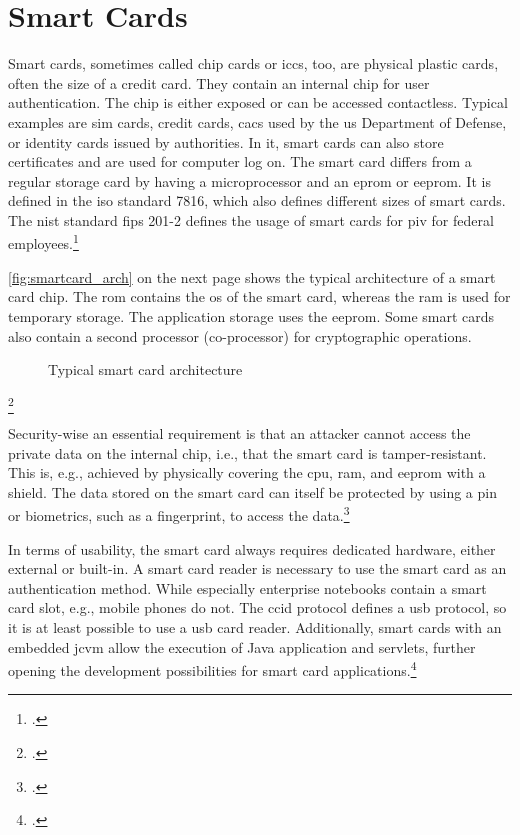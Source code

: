 \section{Smart Cards}

Smart cards, sometimes called chip cards or \glspl{icc}, too, are physical plastic cards, often the size of a credit card. They contain an internal chip for user authentication. The chip is either exposed or can be accessed contactless. Typical examples are \gls{sim} cards, credit cards, \glspl{cac} used by the \gls{us} Department of Defense, or identity cards issued by authorities. In \gls{it}, smart cards can also store certificates and are used for computer log on. The smart card differs from a regular storage card by having a microprocessor and an \gls{eprom} or \gls{eeprom}. It is defined in the \gls{iso} standard 7816, which also defines different sizes of smart cards. The \gls{nist} standard \gls{fips} 201-2 defines the usage of smart cards for \gls{piv} for federal employees.\footcites[See][525--527]{eckert-it-sec-9}[See][]{iso7816}[See][6--9]{Mayes2017}[See][]{FIPS201-2}

\autoref{fig:smartcard_arch} on the next page shows the typical architecture of a smart card chip. The \gls{rom} contains the \gls{os} of the smart card, whereas the \gls{ram} is used for temporary storage. The application storage uses the \gls{eeprom}. Some smart cards also contain a second processor (co-processor) for cryptographic operations.

\newpage

\begin{figure}[hbt]
	\centering
	
	\caption[Typical smart card architecture]{Typical smart card architecture\footnotemark}
	\label{fig:smartcard_arch}
\end{figure}
\footcitetexts[Source: diagram by author, based on][33]{electronic_certification_mobile_devices}[][228]{Tunstall2017}

Security-wise an essential requirement is that an attacker cannot access the private data on the internal chip, i.e., that the smart card is tamper-resistant. This is, e.g., achieved by physically covering the \gls{cpu}, \gls{ram}, and \gls{eeprom} with a shield. The data stored on the smart card can itself be protected by using a \gls{pin} or biometrics, such as a fingerprint, to access the data.\footcites[See][34]{265831}[See][228]{Tunstall2017}

In terms of usability, the smart card always requires dedicated hardware, either external or built-in. A smart card reader is necessary to use the smart card as an authentication method. While especially enterprise notebooks contain a smart card slot, e.g., mobile phones do not. The \gls{ccid} protocol defines a \gls{usb} protocol, so it is at least possible to use a \gls{usb} card reader. Additionally, smart cards with an embedded \gls{jcvm} allow the execution of Java application and servlets, further opening the development possibilities for smart card applications.\footcites[See][65]{Markantonakis2017}[See][539]{eckert-it-sec-9}
